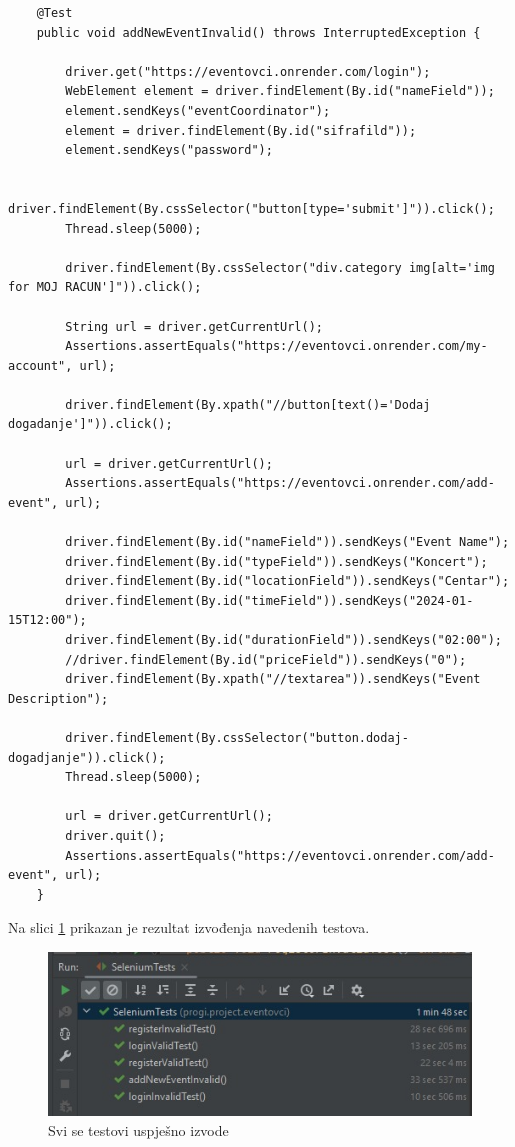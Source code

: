 \begin{lstlisting}
	@Test
	public void addNewEventInvalid() throws InterruptedException {
		
		driver.get("https://eventovci.onrender.com/login");
		WebElement element = driver.findElement(By.id("nameField"));
		element.sendKeys("eventCoordinator");
		element = driver.findElement(By.id("sifrafild"));
		element.sendKeys("password");
		
		driver.findElement(By.cssSelector("button[type='submit']")).click();
		Thread.sleep(5000);
		
		driver.findElement(By.cssSelector("div.category img[alt='img for MOJ RACUN']")).click();
		
		String url = driver.getCurrentUrl();
		Assertions.assertEquals("https://eventovci.onrender.com/my-account", url);
		
		driver.findElement(By.xpath("//button[text()='Dodaj dogadanje']")).click();
		
		url = driver.getCurrentUrl();
		Assertions.assertEquals("https://eventovci.onrender.com/add-event", url);
		
		driver.findElement(By.id("nameField")).sendKeys("Event Name");
		driver.findElement(By.id("typeField")).sendKeys("Koncert");
		driver.findElement(By.id("locationField")).sendKeys("Centar");
		driver.findElement(By.id("timeField")).sendKeys("2024-01-15T12:00");
		driver.findElement(By.id("durationField")).sendKeys("02:00");
		//driver.findElement(By.id("priceField")).sendKeys("0");
		driver.findElement(By.xpath("//textarea")).sendKeys("Event Description");
				
		driver.findElement(By.cssSelector("button.dodaj-dogadjanje")).click();
		Thread.sleep(5000);
		
		url = driver.getCurrentUrl();
		driver.quit();
		Assertions.assertEquals("https://eventovci.onrender.com/add-event", url);
	}
\end{lstlisting}

			Na slici \ref{sust} prikazan je rezultat izvođenja navedenih testova.

			\begin{figure}[H]
				\includegraphics[width=\textwidth]{slike/ispitivanje_sustava.jpeg} 
				\centering
				\vspace{-0.2cm}
				\caption{Svi se testovi uspješno izvode}
				\label{sust}
			\end{figure}
			
